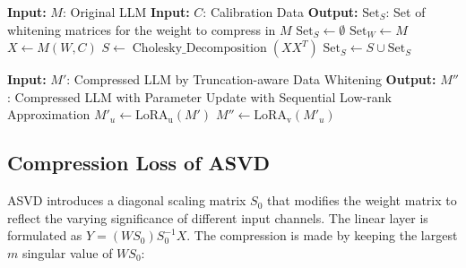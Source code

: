 \begin{algorithm}[ht]
\caption{Pseudocode of Truncation-Aware Data Whitening}
\begin{algorithmic}[1] %
\State \textbf{Input:} $M$: Original LLM
\State \textbf{Input:} $C$: Calibration Data
\State \textbf{Output:} $\text{Set}_S$: Set of whitening matrices for the weight to compress in $M$
    \State $\text{Set}_S \gets \emptyset$   
    \State $\text{Set}_W \gets M$  
        \State $X \gets M(W, C)$ 
        \State $S \gets \operatorname{Cholesky\_Decomposition}(XX^T)$  
        \State $\text{Set}_S \gets S \cup \text{Set}_S$  
    \EndFor
     \State {}
\EndProcedure
\end{algorithmic}
\label{algo:whitening}
\end{algorithm}

\begin{algorithm}[ht]
\caption{}
\begin{algorithmic}[1] %
\State \textbf{Input:} $M'$: Compressed LLM by Truncation-aware Data Whitening
\State \textbf{Output:} $M''$: Compressed LLM with Parameter Update with Sequential Low-rank Approximation
    \State $M'_u \gets \operatorname{LoRA_u}(M')$  
    \State $M'' \gets \operatorname{LoRA_v}(M'_u)$  
      \State {}
\EndProcedure
\end{algorithmic}
\label{algo:updating}
\end{algorithm}


\subsection{Compression Loss of ASVD}
\label{subsec:ASVD_reconstruction_error}
%
ASVD introduces a diagonal scaling matrix $S_0$ that modifies the weight matrix to reflect the varying significance of different input channels. The linear layer is formulated as $Y=(WS_0)S_0^{-1}X$. The compression is made by keeping the largest $m$ singular value of $WS_0$:

